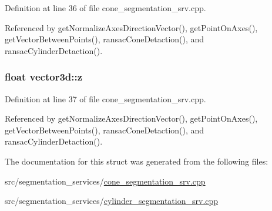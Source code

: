 Definition at line 36 of file cone\-\_\-segmentation\-\_\-srv.\-cpp.



Referenced by get\-Normalize\-Axes\-Direction\-Vector(), get\-Point\-On\-Axes(), get\-Vector\-Between\-Points(), ransac\-Cone\-Detaction(), and ransac\-Cylinder\-Detaction().

\hypertarget{structvector3d_a4e5e948ffcf14e91ebec29e889ced5be}{
\subsubsection[{z}]{\setlength{\rightskip}{0pt plus 5cm}float vector3d\-::z}}\label{structvector3d_a4e5e948ffcf14e91ebec29e889ced5be}


Definition at line 37 of file cone\-\_\-segmentation\-\_\-srv.\-cpp.



Referenced by get\-Normalize\-Axes\-Direction\-Vector(), get\-Point\-On\-Axes(), get\-Vector\-Between\-Points(), ransac\-Cone\-Detaction(), and ransac\-Cylinder\-Detaction().



The documentation for this struct was generated from the following files\-:\begin{DoxyCompactItemize}
\item 
src/segmentation\-\_\-services/\hyperlink{cone__segmentation__srv_8cpp}{cone\-\_\-segmentation\-\_\-srv.\-cpp}\item 
src/segmentation\-\_\-services/\hyperlink{cylinder__segmentation__srv_8cpp}{cylinder\-\_\-segmentation\-\_\-srv.\-cpp}\end{DoxyCompactItemize}
